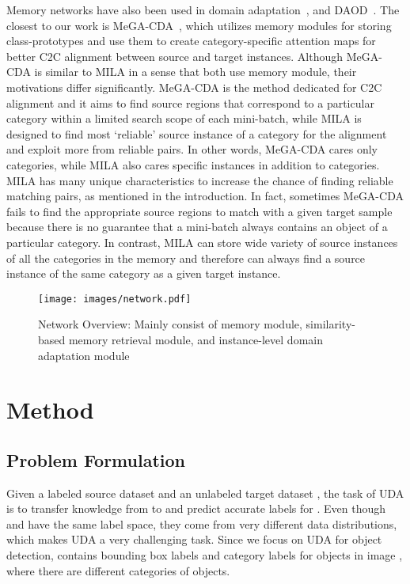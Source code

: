 \documentclass{bmvc2k}
\begin{document}
Memory networks have also been used in domain adaptation~\cite{memsac}, and DAOD~\cite{vs2021mega}. The closest to our work is MeGA-CDA~\cite{vs2021mega}, which utilizes memory modules for storing class-prototypes and use them to create category-specific attention maps for better C2C alignment between source and target instances.
Although MeGA-CDA is similar to MILA in a sense that both use memory module, their motivations differ significantly. 
MeGA-CDA is the method dedicated for C2C alignment and it aims to find source regions that correspond to a particular category within a limited search scope of each mini-batch, while MILA is designed to find most `reliable' source instance of a category for the alignment and exploit more from reliable pairs.
In other words, MeGA-CDA cares only categories, while MILA also cares specific instances in addition to categories.
MILA has many unique characteristics to increase the chance of finding reliable matching pairs, as mentioned in the introduction.
In fact, sometimes MeGA-CDA fails to find the appropriate source regions to match with a given target sample because there is no guarantee that a mini-batch always contains an object of a particular category.
In contrast, MILA can store wide variety of source instances of all the categories in the memory and therefore can always find a source instance of the same category as a given target instance.










\begin{figure*}[t!]
  \centering
  \texttt{[image: images/network.pdf]}
  \caption{Network Overview: Mainly consist of memory module,  similarity-based memory retrieval module, and instance-level domain adaptation module}
  \label{fig:fig2}
\end{figure*}




\section{Method}



\subsection{ Problem Formulation}\label{sec:problem}
Given a labeled source dataset  and an unlabeled target dataset , the task of UDA is to transfer knowledge from  to  and predict accurate labels for . Even though  and  have the same label space, they come from very different data distributions, which makes UDA a very challenging task. Since we focus on UDA for object detection,  contains bounding box labels  and category labels  for  objects in image , where there are  different categories of objects.
\end{document}
